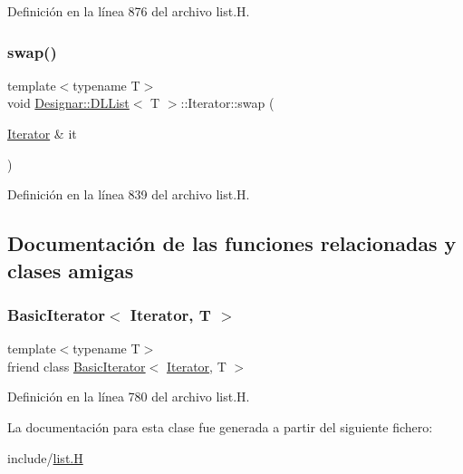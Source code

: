Definición en la línea 876 del archivo list.\+H.

\mbox{\label{class_designar_1_1_d_l_list_1_1_iterator_afb6abdec64f67b81813441a4c7d133d1}} 
\subsubsection{\texorpdfstring{swap()}{swap()}}
{\footnotesize\ttfamily template$<$typename T$>$ \\
void \hyperlink{class_designar_1_1_d_l_list}{Designar\+::\+D\+L\+List}$<$ T $>$\+::Iterator\+::swap (\begin{DoxyParamCaption}\item[{\hyperlink{class_designar_1_1_d_l_list_1_1_iterator}{Iterator} \&}]{it }\end{DoxyParamCaption})\hspace{0.3cm}{\ttfamily [inline]}}



Definición en la línea 839 del archivo list.\+H.



\subsection{Documentación de las funciones relacionadas y clases amigas}
\mbox{\label{class_designar_1_1_d_l_list_1_1_iterator_ae3421d6be56b523bf3c41ceb29f3e5d7}} 
\subsubsection{\texorpdfstring{Basic\+Iterator$<$ Iterator, T $>$}{BasicIterator< Iterator, T >}}
{\footnotesize\ttfamily template$<$typename T$>$ \\
friend class \hyperlink{class_designar_1_1_basic_iterator}{Basic\+Iterator}$<$ \hyperlink{class_designar_1_1_d_l_list_1_1_iterator}{Iterator}, T $>$\hspace{0.3cm}{\ttfamily [friend]}}



Definición en la línea 780 del archivo list.\+H.



La documentación para esta clase fue generada a partir del siguiente fichero\+:\begin{DoxyCompactItemize}
\item 
include/\hyperlink{list_8_h}{list.\+H}\end{DoxyCompactItemize}

